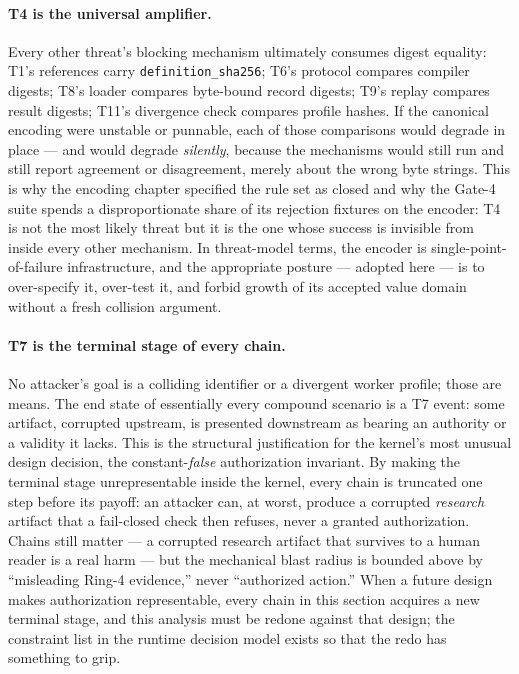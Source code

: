 \paragraph{T4 is the universal amplifier.} Every other threat's blocking mechanism ultimately consumes digest equality: T1's references carry \texttt{definition\_sha256}; T6's protocol compares compiler digests; T8's loader compares byte-bound record digests; T9's replay compares result digests; T11's divergence check compares profile hashes. If the canonical encoding were unstable or punnable, each of those comparisons would degrade in place --- and would degrade \emph{silently}, because the mechanisms would still run and still report agreement or disagreement, merely about the wrong byte strings. This is why the encoding chapter specified the rule set as closed and why the Gate-4 suite spends a disproportionate share of its rejection fixtures on the encoder: T4 is not the most likely threat but it is the one whose success is invisible from inside every other mechanism. In threat-model terms, the encoder is single-point-of-failure infrastructure, and the appropriate posture --- adopted here --- is to over-specify it, over-test it, and forbid growth of its accepted value domain without a fresh collision argument.

\paragraph{T7 is the terminal stage of every chain.} No attacker's goal is a colliding identifier or a divergent worker profile; those are means. The end state of essentially every compound scenario is a T7 event: some artifact, corrupted upstream, is presented downstream as bearing an authority or a validity it lacks. This is the structural justification for the kernel's most unusual design decision, the constant-\emph{false} authorization invariant. By making the terminal stage unrepresentable inside the kernel, every chain is truncated one step before its payoff: an attacker can, at worst, produce a corrupted \emph{research} artifact that a fail-closed check then refuses, never a granted authorization. Chains still matter --- a corrupted research artifact that survives to a human reader is a real harm --- but the mechanical blast radius is bounded above by ``misleading Ring-4 evidence,'' never ``authorized action.'' When a future design makes authorization representable, every chain in this section acquires a new terminal stage, and this analysis must be redone against that design; the constraint list in the runtime decision model exists so that the redo has something to grip.

